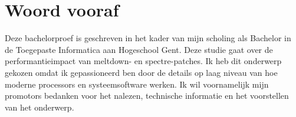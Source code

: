 
\chapter*{Woord vooraf}
\label{ch:voorwoord}


Deze bachelorproef is geschreven in het kader van mijn scholing als Bachelor in de Toegepaste
Informatica aan Hogeschool Gent. Deze studie gaat over de performantieimpact van meltdown- en spectre-patches. Ik heb dit onderwerp gekozen omdat ik gepassioneerd ben door de details op laag niveau van hoe moderne processors en systeemsoftware werken.
Ik wil voornamelijk mijn promotors bedanken voor het nalezen, technische informatie en het voorstellen van het onderwerp.